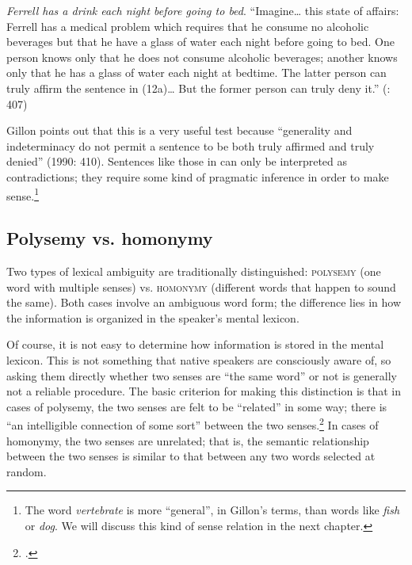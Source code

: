 \largerpage[-2] %
\ea \label{ex:5.12}
\ea \textit{Ferrell has a drink each night before going to bed}.
\ex  “Imagine… this state of affairs: Ferrell has a medical problem which requires that he consume no alcoholic beverages but that he have a glass of water each night before going to bed. One person knows only that he does not consume alcoholic beverages; another knows only that he has a glass of water each night at bedtime. The latter person can truly affirm the sentence in (12a)… But the former person can truly deny it.” (\citealt{Gillon1990}: 407)
\z \z


Gillon points out that this is a very useful test because “generality and indeterminacy do not permit a sentence to be both truly affirmed and truly denied” (1990: 410). Sentences like those in  can only be interpreted as contradictions; they require some kind of pragmatic inference in order to make sense.\footnote{The word \textit{vertebrate} is more “general”, in Gillon’s terms, than words like \textit{fish} or \textit{dog}. We will discuss this kind of sense relation in the next chapter.}


\ea \label{ex:5.13}
                       \z
\z

\subsection{Polysemy vs. homonymy}\label{sec:5.3.3}

Two types of lexical ambiguity are traditionally distinguished: \textsc{polysemy} (one word with multiple senses) vs. \textsc{homonymy} (different words that happen to sound the same). Both cases involve an ambiguous word form; the difference lies in how the information is organized in the speaker’s mental lexicon.


Of course, it is not easy to determine how information is stored in the mental lexicon. This is not something that native speakers are consciously aware of, so asking them directly whether two senses are “the same word” or not is generally not a reliable procedure. The basic criterion for making this distinction is that in cases of polysemy, the two senses are felt to be “related” in some way; there is “an intelligible connection of some sort” between the two senses.\footnote{\citet[109]{Cruse2000}.} In cases of homonymy, the two senses are unrelated; that is, the semantic relationship between the two senses is similar to that between any two words selected at random.



